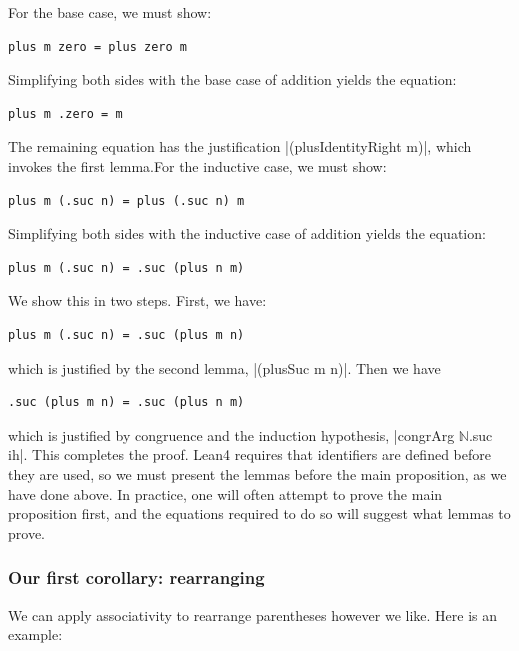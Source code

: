 \documentclass{memoir}
\newcommand{\PLFANat}{\ensuremath{\mathbb{N}}}
\begin{document}
\par
For the base case, we must show:

\par
\par\noindent \begin{verbatim}
plus m zero = plus zero m
\end{verbatim}
Simplifying both sides with the base case of addition yields the equation:\begin{verbatim}
plus m .zero = m
\end{verbatim}
The remaining equation has the justification \LeanVerb|(plusIdentityRight m)|, which
invokes the first lemma.For the inductive case, we must show:\begin{verbatim}
plus m (.suc n) = plus (.suc n) m
\end{verbatim}
Simplifying both sides with the inductive case of addition yields the equation:\begin{verbatim}
plus m (.suc n) = .suc (plus n m)
\end{verbatim}
We show this in two steps. First, we have:\begin{verbatim}
plus m (.suc n) = .suc (plus m n)
\end{verbatim}
which is justified by the second lemma, \LeanVerb|(plusSuc m n)|. Then we have\begin{verbatim}
.suc (plus m n) = .suc (plus n m)
\end{verbatim}
which is justified by congruence and the induction hypothesis,
\LeanVerb|congrArg \PLFANat{}.suc ih|. This completes the proof.
Lean4 requires that identifiers are defined before they are used, so we must
present the lemmas before the main proposition, as we have done above.
In practice, one will often attempt to prove the main proposition first, and
the equations required to do so will suggest what lemmas to prove.

\par

\subsubsection{Our first corollary: rearranging}\label{PLFA--in--Lean----Part--1----Induction-005F-005F-005F--Proof--by--Induction----Second--proof-005F-005F-005F--commutativity----Our--first--corollary-005F-005F-005F--rearranging}

\par
We can apply associativity to rearrange parentheses however we like. Here is an
example:
\end{document}
